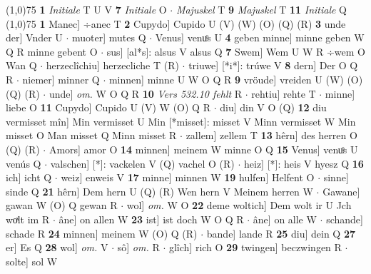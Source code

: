 \documentclass[8pt,a4paper,notitlepage]{article}
\begin{document}
\begin{table}[ht]
\begin{minipage}[t]{0.5\linewidth}
\line(1,0){75} \newline
\textbf{1} \textit{Initiale} T U V  \textbf{7} \textit{Initiale} O   $\cdot$ \textit{Majuskel} T  \textbf{9} \textit{Majuskel} T  \textbf{11} \textit{Initiale} Q  \newline
\line(1,0){75} \newline
\textbf{1} Manec] ÷anec T \textbf{2} Cupydo] Cupido U (V) (W) (O) (Q) (R) \textbf{3} unde der] Vnder U  $\cdot$ muoter] mutes Q  $\cdot$ Venus] venuͦs U \textbf{4} geben minne] minne geben W Q R minne gebent O  $\cdot$ sus] [al*s]: alsus V alsus Q \textbf{7} Swem] Wem U W R ÷wem O Wan Q  $\cdot$ herzeclîchiu] herzecliche T (R)  $\cdot$ triuwe] [*i*]: trúwe V \textbf{8} dern] Der O Q R  $\cdot$ niemer] minner Q  $\cdot$ minnen] minne U W O Q R \textbf{9} vröude] vreiden U (W) (O) (Q) (R)  $\cdot$ unde] \textit{om.} W O Q R \textbf{10} \textit{Vers 532.10 fehlt} R   $\cdot$ rehtiu] rehte T  $\cdot$ minne] liebe O \textbf{11} Cupydo] Cupido U (V) W (O) Q R  $\cdot$ diu] din V O (Q) \textbf{12} diu vermisset mîn] Min vermisset U Min [*misset]: misset V Minn vermisset W Min misset O Man misset Q Minn misset R  $\cdot$ zallem] zellem T \textbf{13} hêrn] des herren O (Q) (R)  $\cdot$ Amors] amor O \textbf{14} minnen] meinem W minne O Q \textbf{15} Venus] venuͦs U venús Q  $\cdot$ valschen] [*]: vackelen V (Q) vachel O (R)  $\cdot$ heiz] [*]: heis V hyesz Q \textbf{16} ich] icht Q  $\cdot$ weiz] enweis V \textbf{17} minne] minnen W \textbf{19} hulfen] Helfent O  $\cdot$ sinne] sinde Q \textbf{21} hêrn] Dem hern U (Q) (R) Wen hern V Meinem herren W  $\cdot$ Gawane] gawan W (O) Q gewan R  $\cdot$ wol] \textit{om.} W O \textbf{22} deme woltich] Dem wolt ir U Jch woͯlt im R  $\cdot$ âne] on allen W \textbf{23} ist] ist doch W O Q R  $\cdot$ âne] on alle W  $\cdot$ schande] schade R \textbf{24} minnen] meinem W (O) Q (R)  $\cdot$ bande] lande R \textbf{25} diu] dein Q \textbf{27} er] Es Q \textbf{28} wol] \textit{om.} V  $\cdot$ sô] \textit{om.} R  $\cdot$ glîch] rich O \textbf{29} twingen] beczwingen R  $\cdot$ solte] sol W \newline
\end{minipage}
\end{table}
\end{document}
